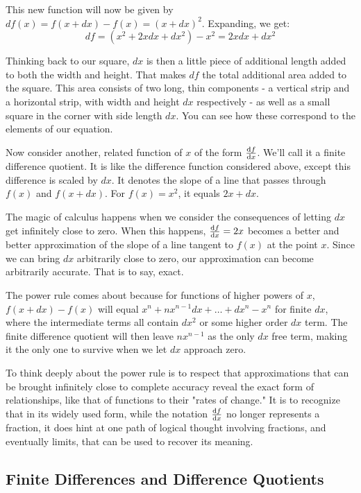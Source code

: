 \documentclass[a4paper]{article}
\begin{document}
This new function will now be given by $df(x) = f(x+dx)-f(x) = (x+dx)^2$. Expanding, we get:
$$ df = (x^2 + 2xdx + dx^2)-x^2 = 2xdx + dx^2 $$

Thinking back to our square, $dx$ is then a little piece of additional length added to both the width and height. That makes $df$ the total additional area added to the square. This area consists of two long, thin components - a vertical strip and a horizontal strip, with width and height $dx$ respectively - as well as a small square in the corner with side length $dx$. You can see how these correspond to the elements of our equation.

Now consider another, related function of $x$ of the form $\dv{f}{x} (x)$. We'll call it a finite difference quotient. It is like the difference function considered above, except this difference is scaled by $dx$. It denotes the slope of a line that passes through $f(x)$ and $f(x+dx)$. For $f(x)=x^2$, it equals $2x + dx$.

The magic of calculus happens when we consider the consequences of letting $dx$ get infinitely close to zero. When this happens, $\dv{f}{x}=2x$ becomes a better and better approximation of the slope of a line tangent to $f(x)$ at the point $x$. Since we can bring $dx$ arbitrarily close to zero, our approximation can become arbitrarily accurate. That is to say, exact.

The power rule comes about because for functions of higher powers of $x$, $f(x+dx)-f(x)$ will equal $x^n + nx^{n-1}dx + \ldots + dx^n - x^n$ for finite $dx$, where the intermediate terms all contain $dx^2$ or some higher order $dx$ term. The finite difference quotient will then leave $nx^{n-1}$ as the only $dx$ free term, making it the only one to survive when we let $dx$ approach zero.

To think deeply about the power rule is to respect that approximations that can be brought infinitely close to complete accuracy reveal the exact form of relationships, like that of functions to their "rates of change." It is to recognize that in its widely used form, while the notation $\dv{f}{x}$ no longer represents a fraction, it does hint at one path of logical thought involving fractions, and eventually limits, that can be used to recover its meaning.

\subsection{Finite Differences and Difference Quotients}
\end{document}

